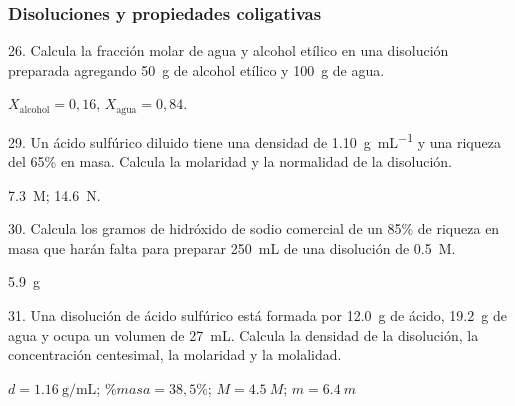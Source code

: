 \documentclass[11pt]{article}
\begin{document}
\begin{multicols}{2}
\subsubsection{Disoluciones y propiedades coligativas}

\begin{exercise}
  26. Calcula la fracción molar de agua y alcohol etílico en una
  disolución preparada agregando \SI{50}{\gram} de alcohol etílico y \SI{100}{\gram} de agua.
\end{exercise}
\begin{solution}
  $X_\textrm{alcohol} = 0,16$, $X_\textrm{agua} = 0,84$.
\end{solution}

\begin{exercise}
  29. Un ácido sulfúrico diluido tiene una densidad de \SI{1.10}{\gram\per\milli\liter} y una riqueza del 65\% en masa. Calcula la molaridad y la normalidad de la disolución.
\end{exercise}
\begin{solution}
  \SI{7.3}{M}; \SI{14.6}{N}.
\end{solution}

\begin{exercise}
  30. Calcula los gramos de hidróxido de sodio comercial de un
  85\% de riqueza en masa que harán falta para preparar \SI{250}{\milli\liter} de una disolución de  \SI{0.5}{M}.
\end{exercise}
\begin{solution}
\SI{5.9}{\gram}
\end{solution}

\begin{exercise}
  31. Una disolución de ácido sulfúrico está formada por \SI{12.0}{\gram} de
  ácido, \SI{19.2}{\gram} de agua y ocupa un volumen de \SI{27}{\milli\liter}. Calcula la densidad de la disolución, la concentración centesimal, la molaridad y la molalidad.
\end{exercise}
\begin{solution}
  $d = \SI{1.16}{\gram\per\milli\liter}$; $\%masa= 38,5\%$; $M= \SI{4.5}{M}$; $m= \SI{6.4}{m}$
\end{solution}


\end{multicols}
\end{document}
